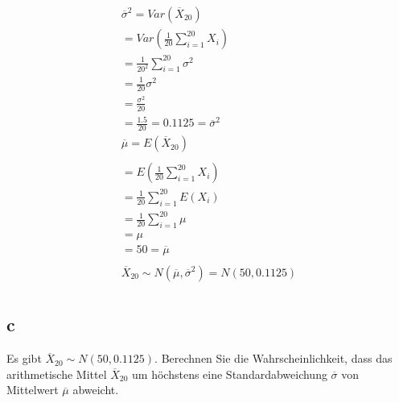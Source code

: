 \begin{align*}
    \overline{\sigma}^2 = Var(\overline{X}_{20})                                  \\
    = Var(\frac{1}{20} \sum_{i = 1}^{20}X_i)                                      \\
    = \frac{1}{20^2} \sum_{i = 1}^{20} \sigma^2                                   \\
    = \frac{1}{20} \sigma^2                                                       \\
    = \frac{\sigma^2}{20}                                                         \\
    = \frac{1.5}{20} = 0.1125 = \overline{\sigma}^2                               \\
    \overline{\mu} = E(\overline{X}_{20})                                         \\\\
    = E\left(\frac{1}{20}\sum_{i = 1}^{20}X_i\right)                              \\
    = \frac{1}{20} \sum_{i = 1}^{20} E(X_i)                                       \\
    = \frac{1}{20} \sum_{i = 1}^{20} \mu                                          \\
    = \mu                                                                         \\
    = 50 = \overline{\mu}                                                         \\\\
    \overline{X}_{20} \sim N(\overline{\mu}, \overline{\sigma}^2) = N(50, 0.1125) \\
\end{align*}

\subsection{c}

Es gibt $\overline{X}_{20} \sim N(50, 0.1125)$. Berechnen Sie die
Wahrscheinlichkeit, dass das arithmetische Mittel $\overline{X}_{20}$ um
höchstens eine Standardabweichung $\overline{\sigma}$ von Mittelwert
$\overline{\mu}$ abweicht.

